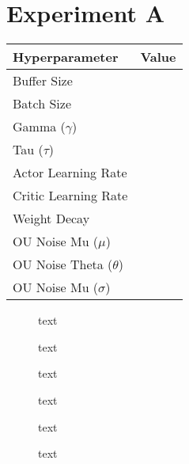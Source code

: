 \section{Experiment A}

\begin{minipage}{0.45\textwidth}
	\centering
	\begin{tabular}{lr}
	\toprule
	\textbf{Hyperparameter} & \textbf{Value} \\
	\midrule
	Buffer Size & \\
	Batch Size & \\
	Gamma ($\gamma$) & \\
	Tau ($\tau$) & \\
	Actor Learning Rate & \\
	Critic Learning Rate & \\
	Weight Decay & \\
	OU Noise Mu ($\mu$) & \\
	OU Noise Theta ($\theta$) & \\
	OU Noise Mu ($\sigma$) & \\
	\bottomrule
	\end{tabular}
\end{minipage}
\hspace{1cm}
\begin{minipage}{0.45\textwidth}
	\centering
\end{minipage}

\begin{figure}[h]
	\begin{minipage}{0.45\textwidth}
		\centering
		
		\caption{text}
		\label{fig:5101_raw_reward}
	\end{minipage}
	\hspace{0.75cm}
	\begin{minipage}{0.45\textwidth}
		\centering
		
		\caption{text}
		\label{fig:5102_average_reward}
	\end{minipage}
\end{figure}

\begin{figure}[h]
	\begin{minipage}{0.45\textwidth}
		\centering
		\caption{text}
		\label{key}
	\end{minipage}
	\hspace{1cm}
	\begin{minipage}{0.45\textwidth}
		\centering
		\caption{text}
		\label{key}
	\end{minipage}
\end{figure}

\begin{figure}[h]
	\begin{minipage}{0.45\textwidth}
		\centering
		\caption{text}
		\label{key}
	\end{minipage}
	\hspace{1cm}
	\begin{minipage}{0.45\textwidth}
		\centering
		\caption{text}
		\label{key}
	\end{minipage}
\end{figure}